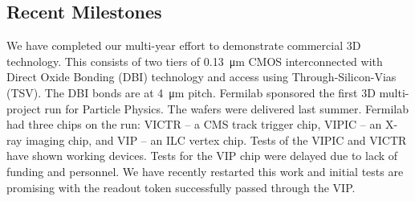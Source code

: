 \subsection{Recent Milestones}
We have completed our multi-year effort to demonstrate commercial 3D technology. This consists of two tiers of \SI{0.13}{\micro\meter} CMOS interconnected with Direct Oxide Bonding (DBI) technology and access using Through-Silicon-Vias (TSV). The DBI bonds are at \SI{4}{\micro\meter} pitch. Fermilab sponsored the first 3D multi-project run for Particle Physics. The wafers were delivered last summer. Fermilab had three chips on the run: VICTR -- a CMS track trigger chip, VIPIC -- an X-ray imaging chip, and VIP -- an ILC vertex chip. Tests of the VIPIC and VICTR have shown working devices.  Tests for the VIP chip were delayed due to lack of funding and personnel.  We have recently restarted this work and initial tests are promising with the readout token successfully passed through the VIP.

